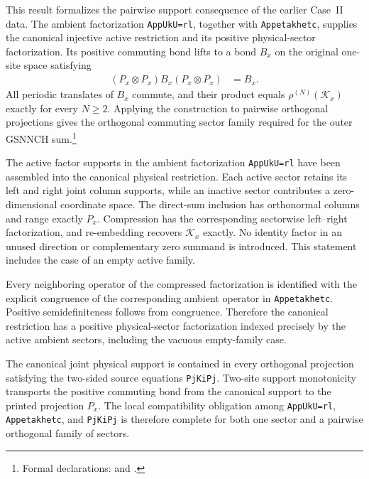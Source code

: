 \documentclass{article}
\begin{document}
This result formalizes the pairwise support consequence of the earlier
Case~II data. The ambient factorization \texttt{AppUkU=rl}, together with
\texttt{Appetakhetc}, supplies the canonical injective active restriction and
its positive physical-sector factorization. Its positive commuting bond lifts
to a bond $B_x$ on the original one-site space satisfying
\begin{align}
    (P_x\otimes P_x)B_x(P_x\otimes P_x)
        &=B_x.
    \label{eq:cpsv16_gsnnch_sector_decomposition_supported_lifted_bond}
\end{align}
All periodic translates of $B_x$ commute, and their product equals
$\rho^{(N)}(\mathcal K_x)$ exactly for every $N\geq2$. Applying the construction
to pairwise orthogonal projections gives the orthogonal commuting sector family
required for the outer GSNNCH sum.\footnote{\raggedright Formal declarations:
and
.}

The active factor supports in the ambient factorization
\texttt{AppUkU=rl} have been assembled into the canonical physical
restriction. Each active sector retains its left and right joint column
supports, while an inactive sector contributes a zero-dimensional coordinate
space. The direct-sum inclusion has orthonormal columns and range exactly
$P_x$. Compression has the corresponding sectorwise left--right factorization,
and re-embedding recovers $\mathcal K_x$ exactly. No identity factor in an
unused direction or complementary zero summand is introduced. This statement
includes the case of an empty active family.

Every neighboring operator of the compressed factorization is identified with
the explicit congruence of the corresponding ambient operator in
\texttt{Appetakhetc}. Positive semidefiniteness follows from congruence.
Therefore the canonical restriction has a positive physical-sector
factorization indexed precisely by the active ambient sectors, including the
vacuous empty-family case.

The canonical joint physical support is contained in every orthogonal
projection satisfying the two-sided source equations \texttt{PjKiPj}.
Two-site support monotonicity transports the positive commuting bond from the
canonical support to the printed projection $P_x$. The local compatibility
obligation among \texttt{AppUkU=rl}, \texttt{Appetakhetc}, and
\texttt{PjKiPj} is therefore complete for both one sector and a pairwise
orthogonal family of sectors.
\end{document}
